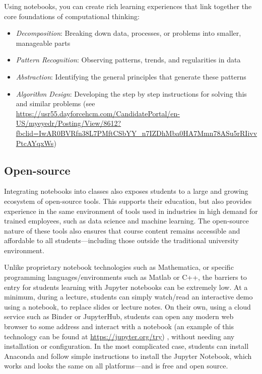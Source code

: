 \documentclass[]{book}
\providecommand{\tightlist}{%
  \setlength{\itemsep}{0pt}\setlength{\parskip}{0pt}}
\begin{document}
Using notebooks, you can create rich learning experiences that link
together the core foundations of computational thinking:

\begin{itemize}
\tightlist
\item
  \emph{Decomposition}: Breaking down data, processes, or problems into
  smaller, manageable parts
\item
  \emph{Pattern Recognition}: Observing patterns, trends, and
  regularities in data
\item
  \emph{Abstraction}: Identifying the general principles that generate
  these patterns
\item
  \emph{Algorithm Design}: Developing the step by step instructions for
  solving this and similar problems (see
  \url{https://usr55.dayforcehcm.com/CandidatePortal/en-US/myeyedr/Posting/View/8612?fbclid=IwAR0BVRfn38L7PMftCSbYY_n7IZDhMba0HA7Mmn78ASu5rRIivvPtcAYqxWs})
\end{itemize}

\subsection{Open-source}\label{open-source}

Integrating notebooks into classes also exposes students to a large and
growing ecosystem of open-source tools. This supports their education,
but also provides experience in the same environment of tools used in
industries in high demand for trained employees, such as data science
and machine learning. The open-source nature of these tools also ensures
that course content remains accessible and affordable to all
students---including those outside the traditional university
environment.

Unlike proprietary notebook technologies such as Mathematica, or
specific programming languages/environments such as Matlab or C++, the
barriers to entry for students learning with Jupyter notebooks can be
extremely low. At a minimum, during a lecture, students can simply
watch/read an interactive demo using a notebook, to replace slides or
lecture notes. On their own, using a cloud service such as Binder or
JupyterHub, students can open any modern web browser to some address and
interact with a notebook (an example of this technology can be found at
\url{https://jupyter.org/try}) , without needing any installation or
configuration. In the most complicated case, students can install
Anaconda and follow simple instructions to install the Jupyter Notebook,
which works and looks the same on all platforms---and is free and open
source.
\end{document}
